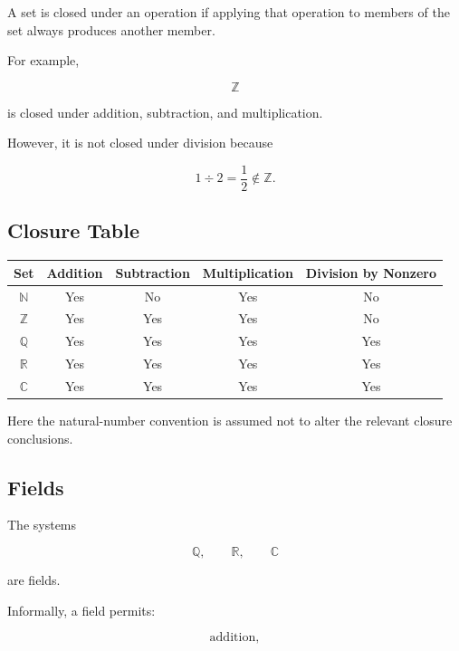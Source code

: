 A set is closed under an operation if applying that operation to members of
the set always produces another member.

For example,

\[
\boxed{
\mathbb{Z}
}
\]

is closed under addition, subtraction, and multiplication.

However, it is not closed under division because

\[
\boxed{
1\div2
=
\frac12
\notin
\mathbb{Z}.
}
\]

\subsection{Closure Table}
\label{subsec:number-system-closure-table}

\begin{center}
\begin{tabular}{c|c|c|c|c}
\textbf{Set}
&
\textbf{Addition}
&
\textbf{Subtraction}
&
\textbf{Multiplication}
&
\textbf{Division by Nonzero}
\\ \hline
\(\mathbb{N}\) & Yes & No & Yes & No \\
\(\mathbb{Z}\) & Yes & Yes & Yes & No \\
\(\mathbb{Q}\) & Yes & Yes & Yes & Yes \\
\(\mathbb{R}\) & Yes & Yes & Yes & Yes \\
\(\mathbb{C}\) & Yes & Yes & Yes & Yes
\end{tabular}
\end{center}

Here the natural-number convention is assumed not to alter the relevant
closure conclusions.

\subsection{Fields}
\label{subsec:number-fields-reference}

The systems

\[
\boxed{
\mathbb{Q},
\qquad
\mathbb{R},
\qquad
\mathbb{C}
}
\]

are fields.

Informally, a field permits:

\[
\boxed{
\text{addition},
}
\]

